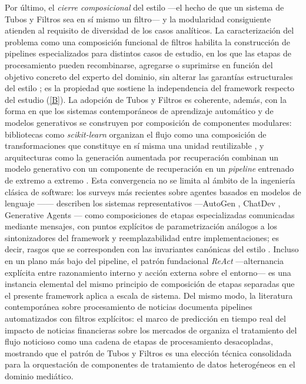 \documentclass[12pt]{report}
\DeclareRobustCommand{\resp}[1]{\hyperref[tab:registro-responsabilidades]{\textcolor{respcolor}{[#1]}}}
\begin{document}
Por último, el \textit{cierre composicional} del estilo ---el hecho de que un sistema de Tubos y Filtros sea en sí mismo un filtro--- y la modularidad consiguiente atienden al requisito de diversidad de los casos analíticos. La caracterización del problema como una composición funcional de filtros habilita la construcción de pipelines especializados para distintos casos de estudio, en los que las etapas de procesamiento pueden recombinarse, agregarse o suprimirse en función del objetivo concreto del experto del dominio, sin alterar las garantías estructurales del estilo \citep{hohpe:2003}; es la propiedad que sostiene la independencia del framework respecto del estudio (\resp{B}). La adopción de Tubos y Filtros es coherente, además, con la forma en que los sistemas contemporáneos de aprendizaje automático y de modelos generativos se construyen por composición de componentes modulares: bibliotecas como \textit{scikit-learn} organizan el flujo como una composición de transformaciones que constituye en sí misma una unidad reutilizable \citep{buitinck:2013}, y arquitecturas como la generación aumentada por recuperación combinan un modelo generativo con un componente de recuperación en un \textit{pipeline} entrenado de extremo a extremo \citep{lewis:2020}. Esta convergencia no se limita al ámbito de la ingeniería clásica de software: los surveys más recientes sobre agentes basados en modelos de lenguaje ---\citet{wang:2024, xi:2023}--- describen los sistemas representativos ---AutoGen \citep{wu:2023}, ChatDev \citep{qian:2023}, Generative Agents \citep{park:2023}--- como composiciones de etapas especializadas comunicadas mediante mensajes, con puntos explícitos de parametrización análogos a los sintonizadores del framework y reemplazabilidad entre implementaciones; es decir, rasgos que se corresponden con las invariantes canónicas del estilo \citep{garlanshaw:1994}. Incluso en un plano más bajo del pipeline, el patrón fundacional \textit{ReAct} \citep{yao:2023} ---alternancia explícita entre razonamiento interno y acción externa sobre el entorno--- es una instancia elemental del mismo principio de composición de etapas separadas que el presente framework aplica a escala de sistema. Del mismo modo, la literatura contemporánea sobre procesamiento de noticias documenta pipelines automatizados con filtros explícitos: el marco de predicción en tiempo real del impacto de noticias financieras sobre los mercados de \citet{chen:2023} organiza el tratamiento del flujo noticioso como una cadena de etapas de procesamiento desacopladas, mostrando que el patrón de Tubos y Filtros es una elección técnica consolidada para la orquestación de componentes de tratamiento de datos heterogéneos en el dominio mediático.
\end{document}
